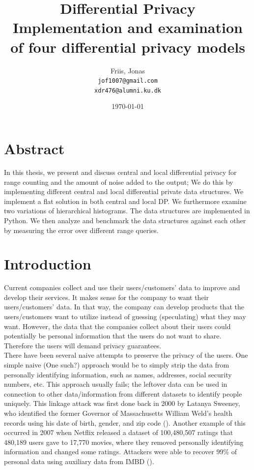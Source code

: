 \documentclass[11pt]{article}
\title{
  \vspace{3cm}
  \Huge{Differential Privacy} \\
  \Large{Implementation and examination of four differential privacy models}
}
\author{
  \Large{Friis, Jonas}
  \\ \texttt{jof1007@gmail.com} \\
\texttt{xdr476@alumni.ku.dk}
}
\date{
    \today
}
\theoremstyle{definition}
\def \ColourPDF {include/ku-farve}
\def \TitlePDF   {include/nat-en}  %
\begin{document}


\clearpage\maketitle
\thispagestyle{empty}

\newpage

\section{Abstract}
In this thesis, we present and discuss central and local differential privacy for range counting and the amount of noise added to the output; We do this by implementing different central and local differential private data structures. We implement a flat solution in both central and local DP. We furthermore examine two variations of hierarchical histograms. The data structures are implemented in Python. We then analyze and benchmark the data structures against each other by measuring the error over different range queries. 


\newpage
\tableofcontents
\newpage
\section{Introduction}
Current companies collect and use their users/customers' data to improve and develop their services. It makes sense for the company to want their users/customers' data. In that way, the company can develop products that the users/customers want to utilize instead of guessing (speculating) what they may want. However, the data that the companies collect about their users could potentially be personal information that the users do not want to share. Therefore the users will demand privacy guarantees. \\

\noindent There have been several naive attempts to preserve the privacy of the users.  One simple naive (One such?) approach would be to simply strip the data from personally identifying information, such as names, addresses, social security numbers, etc. This approach usually fails; the leftover data can be used in connection to other data/information from different datasets to identify people uniquely. This linkage attack was first done back in 2000 by Latanya Sweeney, who identified the former Governor of Massachusetts  William Weld's health records using his date of birth, gender, and zip code (\cite{Sweeney}). Another example of this occurred in 2007 when Netflix released a dataset of 100,480,507 ratings that 480,189 users gave to 17,770 movies, where they removed personally identifying information and changed some ratings. Attackers were able to recover 99\% of personal data using auxiliary data from IMBD (\cite{netflix}). \\
\end{document}

